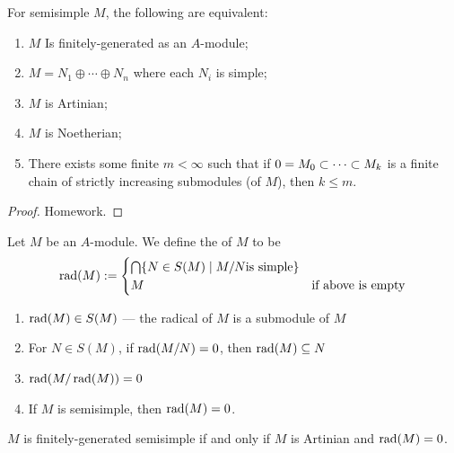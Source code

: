 
\lecture{}

\begin{proposition}\label{prop:2.26}
For semisimple $M$, the following are equivalent:
\begin{enumerate}
\item $M$ Is finitely-generated as an $A$-module;
\item $M=N_{1}\oplus\cdots\oplus N_{n}$ where each $N_{i}$ is simple;
\item $M$ is Artinian;
\item $M$ is Noetherian;
\item There exists some finite $m<\infty$ such that if
  $0=M_{0}\propersubset\cdots\propersubset M_{k}$ is a finite chain of strictly
  increasing submodules (of $M$), then $k\leq m$.
\end{enumerate}
\end{proposition}

\begin{proof}
Homework.
\end{proof}

\begin{definition}\label{defn:2.27}
Let $M$ be an $A$-module. We define the  of $M$
to be
\begin{equation}
\operatorname{rad}(M):=\begin{cases}\bigcap\{N\in S(M)\mid M/N\mbox{is simple}\}&\\
M &\mbox{if above is empty}
\end{cases}
\end{equation}
\end{definition}

\begin{lemma}\label{lemma:2.28}
\begin{enumerate}
\item $\operatorname{rad}(M)\in S(M)$ --- the radical of $M$ is a submodule of $M$
\item For $N\in S(M)$, if $\operatorname{rad}(M/N)=0$, then $\operatorname{rad}(M)\subseteq N$
\item $\operatorname{rad}(M/\operatorname{rad}(M))=0$
\item If $M$ is semisimple, then $\operatorname{rad}(M)=0$.
\end{enumerate}
\end{lemma}

\begin{proposition}\label{prop:2.29}
$M$ is finitely-generated semisimple if and only if $M$ is Artinian
  and $\operatorname{rad}(M)=0$.
\end{proposition}

